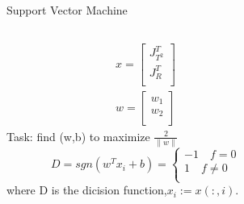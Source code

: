 \documentclass[10pt]{beamer}
\newcommand{\norm}[1]{\left\lVert#1\right\rVert}
\begin{document}
\begin{frame}{Support Vector Machine}
\begin{columns}
        \begin{column}{0.5\textwidth}
           \begin{equation} \nonumber
           \begin{aligned}
               x = \begin{bmatrix}
                   J_{T^2}^T \\
                   J_R^T \\
                   \end{bmatrix} \\
                   w = \begin{bmatrix}
                        w_1 \\
                        w_2 \\
                       \end{bmatrix}
           \end{aligned}
           \end{equation}
           Task: find (w,b) to maximize $\frac{2}{\norm{w}}$
           \begin{equation} \nonumber
           D = sgn(w^Tx_i+b) = 
           \left\{  \begin{aligned} -1 \quad f = 0  \\
                                     1 \quad f \neq 0  \\   
                    \end{aligned}   
           \right.
           \end{equation}
           where D is the dicision function,$x_i:=x(:,i)$.
        \end{column}
        \begin{column}{0.5\textwidth}  %
            \begin{figure}[!htb] 
                \centering 
\end{figure}
\end{column}
\end{columns}
\end{frame}
\end{document}

